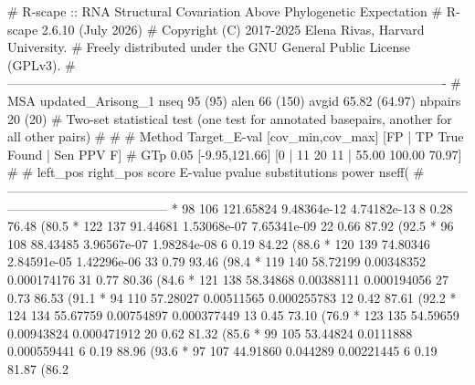 \begin{sreoutput}
# R-scape :: RNA Structural Covariation Above Phylogenetic Expectation
# R-scape 2.6.10 (July 2026)
# Copyright (C) 2017-2025 Elena Rivas, Harvard University.
# Freely distributed under the GNU General Public License (GPLv3).
#-------------------------------------------------------------------------------------------------------
# MSA updated_Arisong_1 nseq 95 (95) alen 66 (150) avgid 65.82 (64.97) nbpairs 20 (20)
# Two-set statistical test (one test for annotated basepairs, another for all other pairs)
#
#
# Method Target_E-val [cov_min,cov_max] [FP | TP True Found | Sen PPV F] 
# GTp    0.05         [-9.95,121.66]     [0 | 11 20 11 | 55.00 100.00 70.97] 
#
#  left_pos   right_pos   score       E-value      pvalue       substitutions   power   nseff(%
#--------------------------------------------------------------------------------------------------------------------------------------------------
*        98        106    121.65824   9.48364e-12  4.74182e-13     8            0.28    76.48 (80.5%
*       122        137     91.44681   1.53068e-07  7.65341e-09     22           0.66    87.92 (92.5%
*        96        108     88.43485   3.96567e-07  1.98284e-08     6            0.19    84.22 (88.6%
*       120        139     74.80346   2.84591e-05  1.42296e-06     33           0.79    93.46 (98.4%
*       119        140     58.72199   0.00348352   0.000174176     31           0.77    80.36 (84.6%
*       121        138     58.34868   0.00388111   0.000194056     27           0.73    86.53 (91.1%
*        94        110     57.28027   0.00511565   0.000255783     12           0.42    87.61 (92.2%
*       124        134     55.67759   0.00754897   0.000377449     13           0.45    73.10 (76.9%
*       123        135     54.59659   0.00943824   0.000471912     20           0.62    81.32 (85.6%
*        99        105     53.44824   0.0111888    0.000559441     6            0.19    88.96 (93.6%
*        97        107     44.91860   0.044289     0.00221445      6            0.19    81.87 (86.2%



\end{sreoutput}
